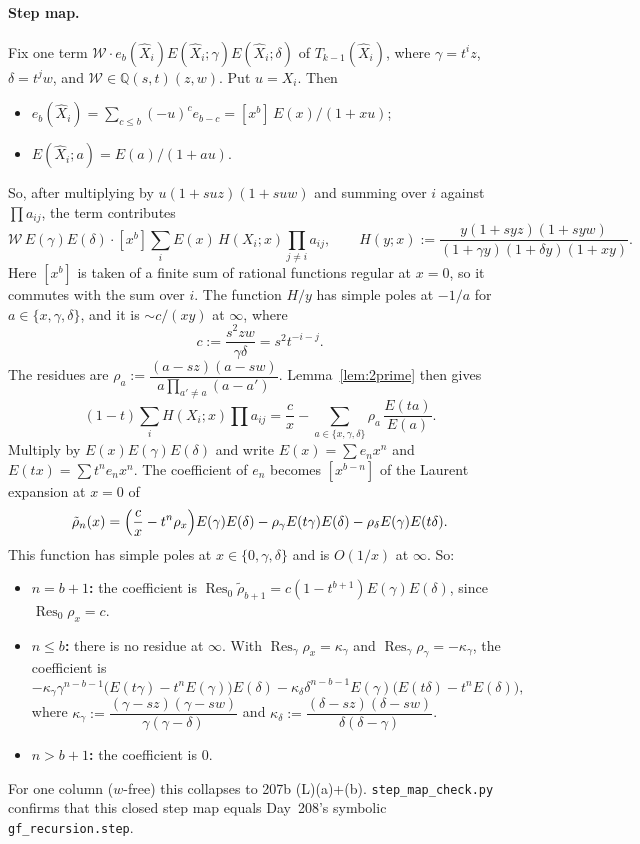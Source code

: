 \documentclass[11pt]{amsart}
\theoremstyle{remark}
\newcommand{\hX}{\widehat{X}}
\newcommand{\cW}{\mathcal{W}}
\newcommand{\Res}{\operatorname*{Res}}
\begin{document}
\paragraph{Step map.} Fix one term $\cW\cdot e_b(\hX_i)E(\hX_i;\gamma)E(\hX_i;\delta)$ of $T_{k-1}(\hX_i)$, where $\gamma=t^iz$, $\delta=t^jw$, and $\cW\in\mathbb{Q}(s,t)(z,w)$. Put $u=X_i$. Then
\begin{itemize}
\item $e_b(\hX_i)=\sum_{c\le b}(-u)^ce_{b-c}=[x^b]\,E(x)/(1+xu)$;
\item $E(\hX_i;a)=E(a)/(1+au)$.
\end{itemize}
So, after multiplying by $u(1+suz)(1+suw)$ and summing over $i$ against $\prod a_{ij}$, the term contributes
\[
\cW\,E(\gamma)E(\delta)\cdot[x^b]\sum_iE(x)\,H(X_i;x)\prod_{j\ne i}a_{ij},\qquad
H(y;x):=\frac{y(1+syz)(1+syw)}{(1+\gamma y)(1+\delta y)(1+xy)}.
\]
Here $[x^b]$ is taken of a finite sum of rational functions regular at $x=0$, so it commutes with the sum over $i$. The function $H/y$ has simple poles at $-1/a$ for $a\in\{x,\gamma,\delta\}$, and it is $\sim c/(xy)$ at $\infty$, where
\[
c:=\frac{s^2zw}{\gamma\delta}=s^2t^{-i-j}.
\]
The residues are $\rho_a:=\dfrac{(a-sz)(a-sw)}{a\prod_{a'\ne a}(a-a')}$. Lemma~\ref{lem:2prime} then gives
\[
(1-t)\sum_iH(X_i;x)\prod a_{ij}=\frac cx-\sum_{a\in\{x,\gamma,\delta\}}\rho_a\,\frac{E(ta)}{E(a)}.
\]
Multiply by $E(x)E(\gamma)E(\delta)$ and write $E(x)=\sum e_nx^n$ and $E(tx)=\sum t^ne_nx^n$. The coefficient of $e_n$ becomes $[x^{b-n}]$ of the Laurent expansion at $x=0$ of
\[
\tilde\rho_n(x)=\Bigl(\frac cx-t^n\rho_x\Bigr)E(\gamma)E(\delta)-\rho_\gamma E(t\gamma)E(\delta)-\rho_\delta E(\gamma)E(t\delta).
\]
This function has simple poles at $x\in\{0,\gamma,\delta\}$ and is $O(1/x)$ at $\infty$. So:
\begin{itemize}
\item \textbf{$n=b+1$:} the coefficient is $\Res_0\tilde\rho_{b+1}=c(1-t^{b+1})E(\gamma)E(\delta)$, since $\Res_0\rho_x=c$.
\item \textbf{$n\le b$:} there is no residue at $\infty$. With $\Res_\gamma\rho_x=\kappa_\gamma$ and $\Res_\gamma\rho_\gamma=-\kappa_\gamma$, the coefficient is
\[
-\kappa_\gamma\gamma^{n-b-1}\bigl(E(t\gamma)-t^nE(\gamma)\bigr)E(\delta)-\kappa_\delta\delta^{n-b-1}E(\gamma)\bigl(E(t\delta)-t^nE(\delta)\bigr),
\]
where $\kappa_\gamma:=\dfrac{(\gamma-sz)(\gamma-sw)}{\gamma(\gamma-\delta)}$ and $\kappa_\delta:=\dfrac{(\delta-sz)(\delta-sw)}{\delta(\delta-\gamma)}$.
\item \textbf{$n>b+1$:} the coefficient is $0$.
\end{itemize}
For one column ($w$-free) this collapses to 207b (L)(a)+(b). \texttt{step\_map\_check.py} confirms that this closed step map equals Day~208's symbolic \texttt{gf\_recursion.step}.
\end{document}
